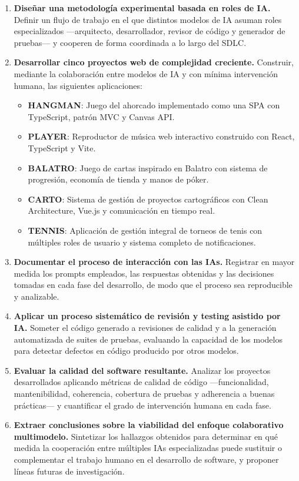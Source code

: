 \begin{enumerate}
  \item \textbf{Diseñar una metodología experimental basada en roles de IA.} Definir un flujo de trabajo en el que distintos modelos de \ac{IA} asuman roles especializados ---arquitecto, desarrollador, revisor de código y generador de pruebas--- y cooperen de forma coordinada a lo largo del \ac{SDLC}.

  \item \textbf{Desarrollar cinco proyectos web de complejidad creciente.} Construir, mediante la colaboración entre modelos de IA y con mínima intervención humana, las siguientes aplicaciones:
  \begin{itemize}
    \item \textbf{\ac{HANGMAN}}: Juego del ahorcado implementado como una \ac{SPA} con TypeScript, patrón \ac{MVC} y Canvas API.
    \item \textbf{\ac{PLAYER}}: Reproductor de música web interactivo construido con React, TypeScript y Vite.
    \item \textbf{\ac{BALATRO}}: Juego de cartas inspirado en Balatro \cite{URL::Balatro} con sistema de progresión, economía de tienda y manos de póker.
    \item \textbf{\ac{CARTO}}: Sistema de gestión de proyectos cartográficos con Clean Architecture, Vue.js y comunicación en tiempo real.
    \item \textbf{\ac{TENNIS}}: Aplicación de gestión integral de torneos de tenis con múltiples roles de usuario y sistema completo de notificaciones.
  \end{itemize}

  \item \textbf{Documentar el proceso de interacción con las IAs.} Registrar en mayor medida los prompts empleados, las respuestas obtenidas y las decisiones tomadas en cada fase del desarrollo, de modo que el proceso sea reproducible y analizable.

  \item \textbf{Aplicar un proceso sistemático de revisión y testing asistido por IA.} Someter el código generado a revisiones de calidad y a la generación automatizada de suites de pruebas, evaluando la capacidad de los modelos para detectar defectos en código producido por otros modelos.

  \item \textbf{Evaluar la calidad del software resultante.} Analizar los proyectos desarrollados aplicando métricas de calidad de código ---funcionalidad, mantenibilidad, coherencia, cobertura de pruebas y adherencia a buenas prácticas--- y cuantificar el grado de intervención humana en cada fase.

  \item \textbf{Extraer conclusiones sobre la viabilidad del enfoque colaborativo multimodelo.} Sintetizar los hallazgos obtenidos para determinar en qué medida la cooperación entre múltiples IAs especializadas puede sustituir o complementar el trabajo humano en el desarrollo de software, y proponer líneas futuras de investigación.
\end{enumerate}




